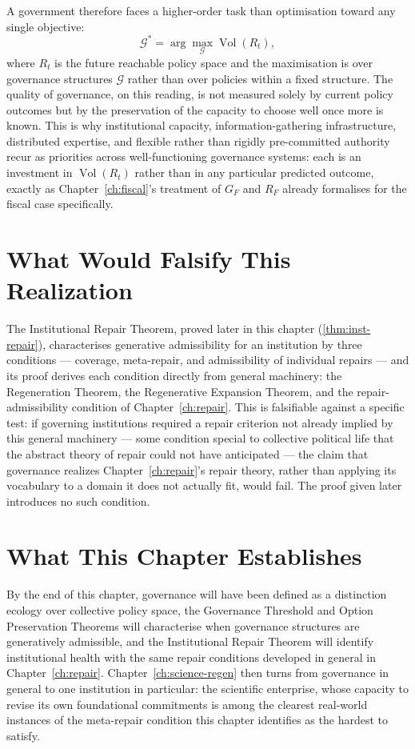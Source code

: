 \documentclass[12pt,twoside,openright]{book}
\newcommand{\Vol}{\operatorname{Vol}}
\begin{document}
A government therefore faces a higher-order task than
optimisation toward any single objective:
\[
  \mathcal{G}^* = \arg\max_{\mathcal{G}} \Vol(R_t),
\]
where $R_t$ is the future reachable policy space and the
maximisation is over governance structures $\mathcal{G}$
rather than over policies within a fixed structure. The
quality of governance, on this reading, is not measured
solely by current policy outcomes but by the preservation of
the capacity to choose well once more is known. This is why
institutional capacity, information-gathering infrastructure,
distributed expertise, and flexible rather than rigidly
pre-committed authority recur as priorities across
well-functioning governance systems: each is an investment in
$\Vol(R_t)$ rather than in any particular predicted outcome,
exactly as Chapter~\ref{ch:fiscal}'s treatment of $G_F$ and
$R_F$ already formalises for the fiscal case specifically.

\section{What Would Falsify This Realization}
\label{sec:ch28-falsifiability}

The Institutional Repair Theorem, proved later in this
chapter (\cref{thm:inst-repair}), characterises generative
admissibility for an institution by three conditions ---
coverage, meta-repair, and admissibility of individual
repairs --- and its proof derives each condition directly
from general machinery: the Regeneration Theorem, the
Regenerative Expansion Theorem, and the repair-admissibility
condition of Chapter~\ref{ch:repair}. This is falsifiable
against a specific test: if governing institutions required a
repair criterion not already implied by this general
machinery --- some condition special to collective political
life that the abstract theory of repair could not have
anticipated --- the claim that governance realizes
Chapter~\ref{ch:repair}'s repair theory, rather than applying
its vocabulary to a domain it does not actually fit, would
fail. The proof given later introduces no such condition.

\section{What This Chapter Establishes}
\label{sec:ch28-preview}

By the end of this chapter, governance will have been defined
as a distinction ecology over collective policy space, the
Governance Threshold and Option Preservation Theorems will
characterise when governance structures are generatively
admissible, and the Institutional Repair Theorem will identify
institutional health with the same repair conditions developed
in general in Chapter~\ref{ch:repair}. Chapter~\ref{ch:science-regen}
then turns from governance in general to one institution in
particular: the scientific enterprise, whose capacity to
revise its own foundational commitments is among the clearest
real-world instances of the meta-repair condition this chapter
identifies as the hardest to satisfy.
\end{document}
